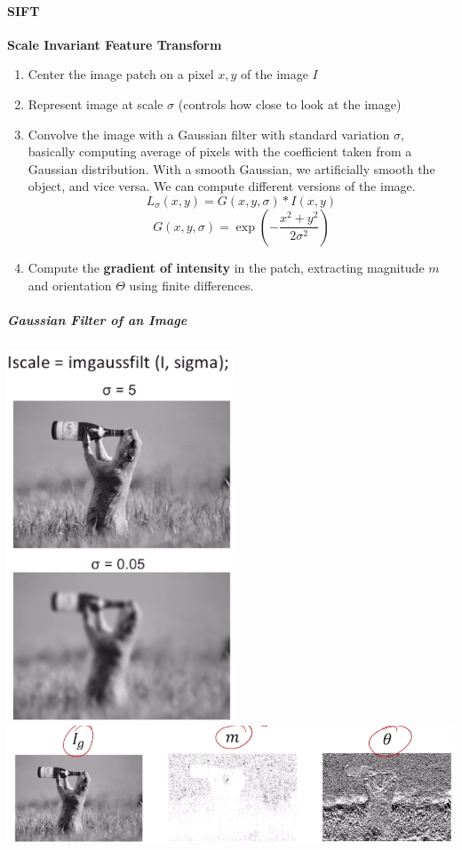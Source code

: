 \documentclass[10pt]{report}
\begin{document}
\paragraph{SIFT} \textbf{Scale Invariant Feature Transform}\begin{enumerate}
	\item Center the image patch on a pixel $x,y$ of the image $I$
	\item Represent image at scale $\sigma$ (controls how close to look at the image)
	\item[] Convolve the image with a Gaussian filter with standard variation $\sigma$, basically computing average of pixels with the coefficient taken from a Gaussian distribution. With a smooth Gaussian, we artificially smooth the object, and vice versa. We can compute different versions of the image.
$$L_\sigma(x,y) = G(x,y,\sigma) * I(x,y)$$
$$G(x,y,\sigma) = \exp\left(-\frac{x^2+y^2}{2\sigma^2}\right)$$
	\item Compute the \textbf{gradient of intensity} in the patch, extracting magnitude $m$ and orientation $\Theta$ using finite differences.
\end{enumerate}
\subparagraph{Gaussian Filter of an Image}
\begin{center}
	\includegraphics[scale=0.5]{1.png} \includegraphics[scale=0.6]{2.png}
\end{center}
\end{document}
